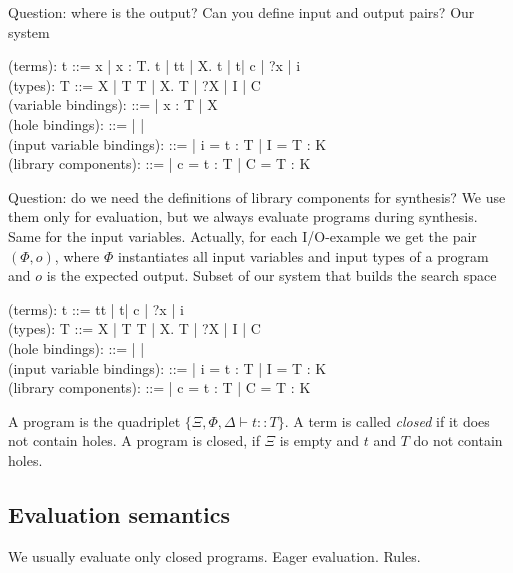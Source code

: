Question: where is the output? Can you define input and output pairs?
Our system
 \begin{plstx}
(terms): t ::= x | \lambda x : T. t | t\;t | \Lambda X. t | t\;[T] | c | {?x} | i\\
(types): T ::= X | T \rightarrow T | \forall X. T | ?X | I | C\;[T,\ldots, T]\\
(variable bindings): \Gamma ::= \emptyset | \Gamma \cup x : T | \Gamma \cup X\\
(hole bindings): \Xi ::= \emptyset | \Xi {} | \Xi {}\\
(input variable bindings): \Phi ::= \emptyset | \Phi \cup i = t : T | \Phi \cup I = T : K\\
(library components): \Delta ::= \emptyset | \Delta \cup c = t : T | \Delta \cup C = T : K\\
\end{plstx}

Question: do we need the definitions of library components for synthesis? We use them only for evaluation, but we always evaluate programs during synthesis. Same for the input variables. Actually, for each I/O-example we get the pair $(\Phi,o)$, where $\Phi$ instantiates all input variables and input types of a program and $o$ is the expected output.
Subset of our system that builds the search space
 \begin{plstx}
(terms): t ::= t\;t | t\;[T] | c | ?x | i\\
(types): T ::= X | T \rightarrow T | \forall X. T | ?X | I | C\;[T,\ldots, T]\\
(hole bindings): \Xi ::= \emptyset | \Xi {} | \Xi {}\\
(input variable bindings): \Phi ::= \emptyset | \Phi \cup i = t : T | \Phi \cup I = T : K\\
(library components): \Delta ::= \emptyset | \Delta \cup c = t : T | \Delta \cup C = T : K\\
\end{plstx}


A program is the quadriplet $\{\Xi, \Phi, \Delta \vdash t :: T\}$. 
A term is called \emph{closed} if it does not contain holes.
A program is closed, if $\Xi$ is empty and $t$ and $T$ do not contain holes.

 
  \subsection{Evaluation semantics}

We usually evaluate only closed programs. Eager evaluation. Rules.
  
